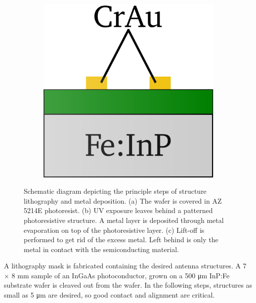 \begin{figure}[!tbp]
\begin{subfigure}[b]{0.21\textwidth}
        \caption{\centering}
        \label{fig:fab12}
    \end{subfigure}
    \hfill
    \begin{subfigure}[b]{0.21\textwidth}
        \centering
        \includegraphics[width=\textwidth]{figures/Fabrication/fab1_3.pdf}
        \caption{\centering}
        \label{fig:fab13}
    \end{subfigure}
    \caption{Schematic diagram depicting the principle steps of structure lithography and metal deposition. (a) The wafer is covered in AZ 5214E photoresist. (b) UV exposure leaves behind a patterned photoresistive structure. A metal layer is deposited through metal evaporation on top of the photoresistive layer. (c) Lift-off is performed to get rid of the excess metal. Left behind is only the metal in contact with the semiconducting material.}
\end{figure}

A lithography mask is fabricated containing the desired antenna structures. A \num{7} $\times$ \num{8} \si{\milli\meter} sample of an InGaAs photoconductor, grown on a \num{500} \si{\micro\meter} InP:Fe substrate wafer is cleaved out from the wafer. In the following steps, structures as small as \num{5} \si{\micro\meter} are desired, so good contact and alignment are critical.

